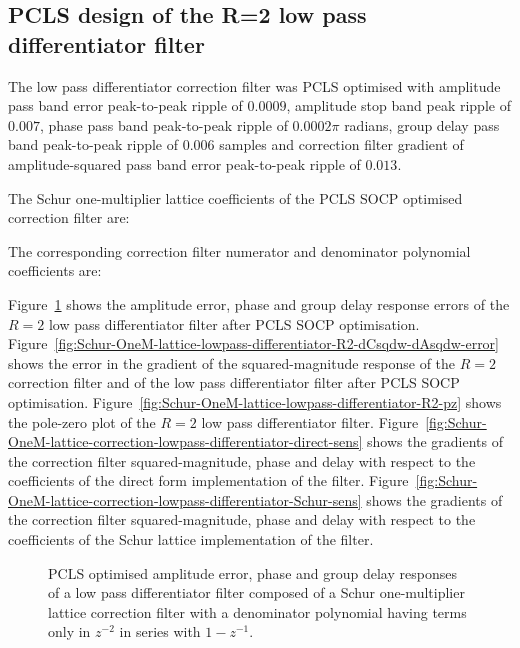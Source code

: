 \documentclass[a4paper,twoside,10pt,english]{article}
\newcommand{\DesignOfSchurLatticeFiltersPdfScale}{1}
\begin{document}
\clearpage

\subsection{PCLS design of the R=2 low pass differentiator filter}
The low pass differentiator correction filter was PCLS optimised with 
amplitude pass band error peak-to-peak ripple of $0.0009$,
amplitude stop band peak ripple of $0.007$,
phase pass band peak-to-peak ripple of $0.0002\pi$\; radians,
group delay pass band peak-to-peak ripple of $0.006$\; samples and
correction filter gradient of amplitude-squared pass band error peak-to-peak
ripple of $0.013$.

The Schur one-multiplier lattice coefficients of the PCLS SOCP optimised
correction filter are:
\begin{small}



\end{small}

The corresponding correction filter numerator and denominator polynomial
coefficients are:
\begin{small}


\end{small}
Figure~\ref{fig:Schur-OneM-lattice-lowpass-differentiator-R2}
shows the  amplitude error, phase and group delay response errors of the $R=2$
low pass differentiator filter after PCLS SOCP optimisation.
Figure~\ref{fig:Schur-OneM-lattice-lowpass-differentiator-R2-dCsqdw-dAsqdw-error}
shows the error in the gradient of the squared-magnitude response of the $R=2$
correction filter and of the low pass differentiator filter after PCLS SOCP
optimisation.
Figure~\ref{fig:Schur-OneM-lattice-lowpass-differentiator-R2-pz} shows
the pole-zero plot of the $R=2$ low pass differentiator filter.
Figure~\ref{fig:Schur-OneM-lattice-correction-lowpass-differentiator-direct-sens}
shows the gradients of the correction filter squared-magnitude, phase and delay
with respect to the coefficients of the direct form implementation of the filter.
Figure~\ref{fig:Schur-OneM-lattice-correction-lowpass-differentiator-Schur-sens}
shows the gradients of the correction filter squared-magnitude, phase and delay
with respect to the coefficients of the Schur lattice implementation of the
filter.
\begin{figure}
\centering
\scalebox{\DesignOfSchurLatticeFiltersPdfScale}{}
\caption{PCLS optimised amplitude error, phase and group delay responses of a
  low pass differentiator filter composed of a Schur one-multiplier lattice
  correction filter with a denominator polynomial having terms only in $z^{-2}$
  in series with $1-z^{-1}$.}
\label{fig:Schur-OneM-lattice-lowpass-differentiator-R2}
\end{figure}
\end{document}
